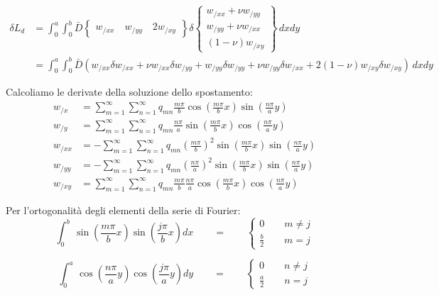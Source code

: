 \begin{align*}
    \delta L_d&=\int_0^a\int_0^b \bar{D} \begin{Bmatrix}
        w_{/xx} \quad  w_{/yy}\quad 2w_{/xy}
    \end{Bmatrix}\delta \begin{Bmatrix}
        w_{/xx}+\nu w_{/yy} \\  w_{/yy}+\nu w_{/xx}\\ (1-\nu)w_{/xy}
    \end{Bmatrix}
    \,dx dy\\
    &=\int_0^a\int_0^b \bar{D} \left( w_{/xx} \delta w_{/xx} + \nu w_{/xx} \delta w_{/yy} + w_{/yy} \delta w_{/yy} + \nu w_{/yy} \delta w_{/xx} + 2(1-\nu)w_{/xy} \delta w_{/xy} \right) \,dx dy
\end{align*}

Calcoliamo le derivate della soluzione dello spostamento:
\begin{align*}
    w_{/x} &= \sum^\infty_{m=1} \sum^\infty_{n=1} q_{mn}\frac{m\pi}{b}\cos\left(\frac{m\pi}{b}x\right) \sin\left(\frac{n\pi}{a}y\right) \\
    w_{/y} &= \sum^\infty_{m=1} \sum^\infty_{n=1} q_{mn}\frac{n\pi}{a}\sin\left(\frac{m\pi}{b}x\right) \cos\left(\frac{n\pi}{a}y\right) \\
    w_{/xx} &= -\sum^\infty_{m=1} \sum^\infty_{n=1} q_{mn}\left(\frac{m\pi}{b}\right)^2\sin\left(\frac{m\pi}{b}x\right) \sin\left(\frac{n\pi}{a}y\right) \\
    w_{/yy} &= -\sum^\infty_{m=1} \sum^\infty_{n=1} q_{mn}\left(\frac{n\pi}{a}\right)^2\sin\left(\frac{m\pi}{b}x\right) \sin\left(\frac{n\pi}{a}y\right) \\
    w_{/xy} &= \sum^\infty_{m=1} \sum^\infty_{n=1} q_{mn}\frac{m\pi}{b}\frac{n\pi}{a}\cos\left(\frac{m\pi}{b}x\right) \cos\left(\frac{n\pi}{a}y\right)
\end{align*}

Per l'ortogonalità degli elementi della serie di Fourier:
\begin{equation*}
\int_0^b \,\sin{\left(\frac{m\pi}{b}x\right)} \sin{\left(\frac{j\pi}{b}x\right)}dx \qquad=\qquad
\begin{cases}
    0\qquad m\neq j\\
    \frac{b}{2} \qquad m=j
\end{cases}
\end{equation*}

\begin{equation*}
\int_0^a \,\cos{\left(\frac{n\pi}{a}y\right)} \cos{\left(\frac{j\pi}{a}y\right)}dy \qquad=\qquad
\begin{cases}
    0\qquad n\neq j\\
    \frac{a}{2} \qquad n=j
\end{cases}
\end{equation*}

